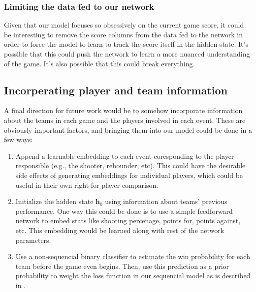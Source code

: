 \subsubsection{Limiting the data fed to our network}

Given that our model focuses so obsessively on the current game score, it could be interesting to remove the score columns from the data fed to the network in order to force the model to learn to track the score itself in the hidden state. It's possible that this could push the network to learn a more nuanced understanding of the game. It's also possible that this could break everything.

\subsection{Incorperating player and team information}

A final direction for future work would be to somehow incorporate information about the teams in each game and the players involved in each event. These are obviously important factors, and bringing them into our model could be done in a few ways:
\begin{enumerate}
	\item Append a learnable embedding \cite[\S 13.2.4.3]{PML} to each event coresponding to the player responsible (e.g., the shooter, rebounder, etc). This could have the desirable side effects of generating embeddings for individual players, which could be useful in their own right for player comparison.
	\item Initialize the hidden state $\mathbf h_0$ using information about teams' previous performance. One way this could be done is to use a simple feedforward network to embed stats like shooting percenage, points for, points against, etc. This embedding would be learned along with rest of the network parameters.
	\item Use a non-sequencial binary classifier to estimate the win probability for each team before the game even begins. Then, use this prediction as a prior probability to weight the loss function in our sequencial model as is described in \textcite[beginning of \S 13.4]{PML}.
\end{enumerate}

